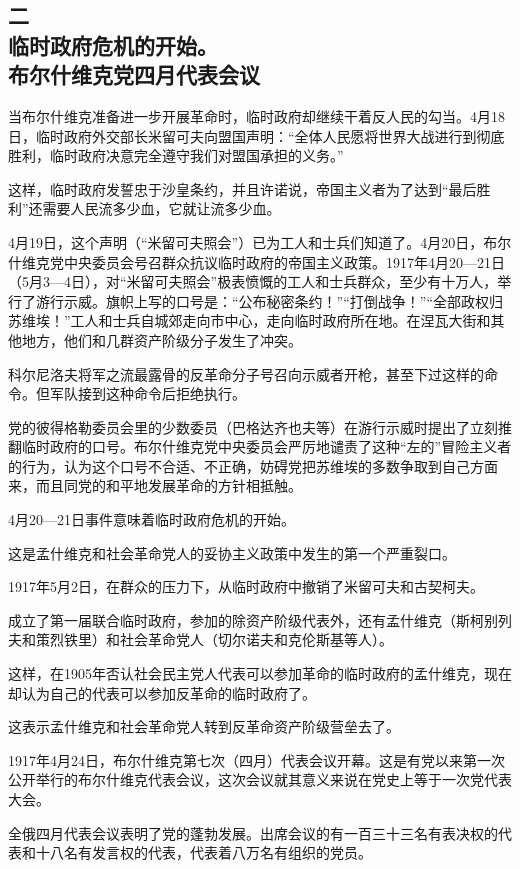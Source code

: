 \subsection[二\q 临时政府危机的开始。布尔什维克党四月代表会议]{二\\临时政府危机的开始。\\布尔什维克党四月代表会议}

当布尔什维克准备进一步开展革命时，临时政府却继续干着反人民的勾当。4月18日，临时政府外交部长米留可夫向盟国声明：“全体人民愿将世界大战进行到彻底胜利，临时政府决意完全遵守我们对盟国承担的义务。”

这样，临时政府发誓忠于沙皇条约，并且许诺说，帝国主义者为了达到“最后胜利”还需要人民流多少血，它就让流多少血。

4月19日，这个声明（“米留可夫照会”）已为工人和士兵们知道了。4月20日，布尔什维克党中央委员会号召群众抗议临时政府的帝国主义政策。1917年4月20—21日（5月3—4日），对“米留可夫照会”极表愤慨的工人和士兵群众，至少有十万人，举行了游行示威。旗帜上写的口号是：“公布秘密条约！”“打倒战争！”“全部政权归苏维埃！”工人和士兵自城郊走向市中心，走向临时政府所在地。在涅瓦大街和其他地方，他们和几群资产阶级分子发生了冲突。

科尔尼洛夫将军之流最露骨的反革命分子号召向示威者开枪，甚至下过这样的命令。但军队接到这种命令后拒绝执行。

党的彼得格勒委员会里的少数委员（巴格达齐也夫等）在游行示威时提出了立刻推翻临时政府的口号。布尔什维克党中央委员会严厉地谴责了这种“左的”冒险主义者的行为，认为这个口号不合适、不正确，妨碍党把苏维埃的多数争取到自己方面来，而且同党的和平地发展革命的方针相抵触。

4月20—21日事件意味着临时政府危机的开始。

这是孟什维克和社会革命党人的妥协主义政策中发生的第一个严重裂口。

1917年5月2日，在群众的压力下，从临时政府中撤销了米留可夫和古契柯夫。

成立了第一届联合临时政府，参加的除资产阶级代表外，还有孟什维克（斯柯别列夫和策烈铁里）和社会革命党人（切尔诺夫和克伦斯基等人）。

这样，在1905年否认社会民主党人代表可以参加革命的临时政府的孟什维克，现在却认为自己的代表可以参加反革命的临时政府了。

这表示孟什维克和社会革命党人转到反革命资产阶级营垒去了。

1917年4月24日，布尔什维克第七次（四月）代表会议开幕。这是有党以来第一次公开举行的布尔什维克代表会议，这次会议就其意义来说在党史上等于一次党代表大会。

全俄四月代表会议表明了党的蓬勃发展。出席会议的有一百三十三名有表决权的代表和十八名有发言权的代表，代表着八万名有组织的党员。

